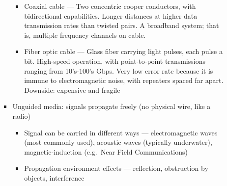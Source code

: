 \begin{itemize}
\begin{itemize}
\begin{itemize}
\begin{itemize}
              \item Coaxial cable — Two concentric cooper conductors, with bidirectional capabilities. Longer distances at higher data transmission rates than twisted pairs. A broadband system; that is, multiple frequency channels on cable.

              \item Fiber optic cable — Glass fiber carrying light pulses, each pulse a bit. High-speed operation, with point-to-point transmissions ranging from 10's-100's Gbps. Very low error rate because it is immune to electromagnetic noise, with repeaters spaced far apart. Downside: expensive and fragile

            \end{itemize}

          \item Unguided media: signals propagate freely (no physical wire, like a radio)

            \begin{itemize}

              \item Signal can be carried in different ways — electromagnetic waves (most commonly used), acoustic waves (typically underwater), magnetic-induction (e.g.\ Near Field Communications)

              \item Propagation environment effects — reflection, obstruction by objects, interference

            \end{itemize}

        \end{itemize}

    \end{itemize}

\end{itemize}



